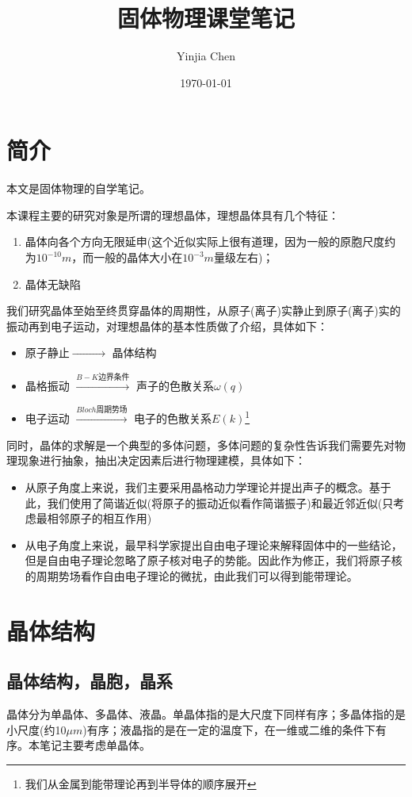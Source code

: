 \documentclass{ctexart}
\title{固体物理课堂笔记}
\author{Yinjia Chen }
\date{\today}
\begin{document}
\maketitle
\tableofcontents
\newpage
\section{简介}
本文是固体物理的自学笔记。

本课程主要的研究对象是所谓的理想晶体，理想晶体具有几个特征：
\begin{enumerate}
    \item 晶体向各个方向无限延申(这个近似实际上很有道理，因为一般的原胞尺度约为$10^{-10}m$，而一般的晶体大小在$10^{-3}m$量级左右)；
    \item 晶体无缺陷
\end{enumerate}

我们研究晶体至始至终贯穿晶体的周期性，从原子(离子)实静止到原子(离子)实的振动再到电子运动，对理想晶体的基本性质做了介绍，具体如下：
\begin{itemize}
    \item 原子静止$\xrightarrow{\quad\quad\quad\quad\ }$ 晶体结构
    \item 晶格振动 $\xrightarrow{B-K\text{边界条件}}$ 声子的色散关系$\omega(q)$
    \item 电子运动 $\xrightarrow{Bloch\text{周期势场}}$ 电子的色散关系$E(k)$\footnote{我们从金属到能带理论再到半导体的顺序展开}
\end{itemize}

同时，晶体的求解是一个典型的多体问题，多体问题的复杂性告诉我们需要先对物理现象进行抽象，抽出决定因素后进行物理建模，具体如下：
\begin{itemize}
    \item 从原子角度上来说，我们主要采用晶格动力学理论并提出声子的概念。基于此，我们使用了简谐近似(将原子的振动近似看作简谐振子)和最近邻近似(只考虑最相邻原子的相互作用)
    \item 从电子角度上来说，最早科学家提出自由电子理论来解释固体中的一些结论，但是自由电子理论忽略了原子核对电子的势能。因此作为修正，我们将原子核的周期势场看作自由电子理论的微扰，由此我们可以得到能带理论。
\end{itemize}


\section{晶体结构}
    \subsection{晶体结构，晶胞，晶系}
晶体分为单晶体、多晶体、液晶。单晶体指的是大尺度下同样有序；多晶体指的是小尺度(约10$\mu m$)有序；液晶指的是在一定的温度下，在一维或二维的条件下有序。本笔记主要考虑单晶体。
\end{document}
